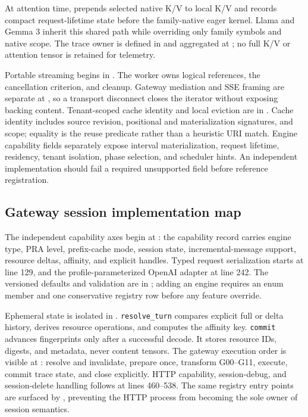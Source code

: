 \documentclass[11pt]{article}
\begin{document}
At attention time,  prepends selected
native K/V to local K/V and records compact request-lifetime state before the
family-native eager kernel. Llama and Gemma 3 inherit this shared path while
overriding only family symbols and native scope. The trace owner is defined in
 and aggregated at
; no full K/V or attention tensor
is retained for telemetry.

Portable streaming begins in
. The worker owns logical references,
the cancellation criterion, and cleanup. Gateway mediation and SSE framing are
separate at , so a transport disconnect
closes the iterator without exposing backing content. Tenant-scoped cache
identity and local eviction are in .
Cache identity includes source revision, positional and materialization
signatures, and scope; equality is the reuse predicate rather than a heuristic
URI match. Engine capability fields separately expose interval materialization,
request lifetime, residency, tenant isolation, phase selection, and scheduler
hints. An independent implementation should fail a required unsupported field
before reference registration.

\subsection{Gateway session implementation map}

The independent capability axes begin at
: the capability record carries engine type,
PRA level, prefix-cache mode, session state, incremental-message support,
resource deltas, affinity, and explicit handles. Typed request serialization
starts at line 129, and the profile-parameterized OpenAI adapter at line 242.
The versioned defaults and validation are in
; adding an engine requires an enum
member and one conservative registry row before any feature override.

Ephemeral state is isolated in
. \texttt{resolve\_turn} compares
explicit full or delta history, derives resource operations, and computes the
affinity key. \texttt{commit} advances fingerprints only after a successful
decode. It stores resource IDs, digests, and metadata, never content tensors.
The gateway execution order is visible at
: resolve and invalidate, prepare once,
transform G00--G11, execute, commit trace state, and close explicitly. HTTP
capability, session-debug, and session-delete handling follows at lines
460--538. The same registry entry points are surfaced by
, preventing the HTTP process from
becoming the sole owner of session semantics.
\end{document}
